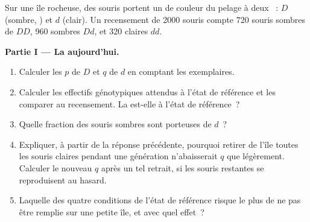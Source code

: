 \begin{problem}
\label{pb:g12:selection-drift-speciation:1}
Sur une île rocheuse, des souris portent un  de couleur du pelage à
deux ~: $D$ (sombre, ) et $d$ (clair). Un recensement de
2000 souris compte 720 souris sombres de  $DD$, 960 sombres
$Dd$, et 320 claires $dd$.

\medskip
\noindent\textbf{Partie I --- La  aujourd'hui.}
\begin{enumerate}
  \item Calculer les  $p$ de $D$ et $q$ de $d$ en comptant
        les exemplaires.
  \item Calculer les effectifs génotypiques attendus à l'état de
        référence et les comparer au recensement. La  est-elle
        à l'état de référence~?
  \item Quelle fraction des souris sombres sont porteuses de $d$~?
  \item Expliquer, à partir de la réponse précédente, pourquoi retirer
        de l'île toutes les souris claires pendant une génération
        n'abaisserait $q$ que légèrement. Calculer le nouveau $q$ après
        un tel retrait, si les souris restantes se reproduisent au
        hasard.
  \item Laquelle des quatre conditions de l'état de référence risque le
        plus de ne pas être remplie sur une petite île, et avec quel
        effet~?
\end{enumerate}


\end{problem}
